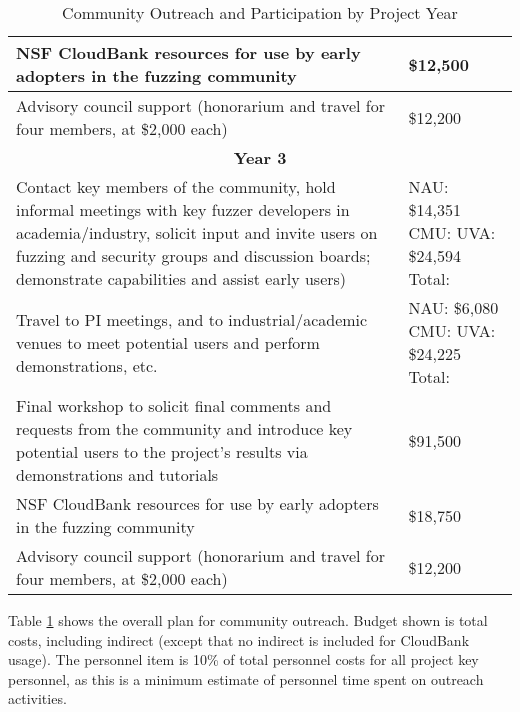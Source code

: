 \documentclass[12pt]{article}
\begin{document}
\begin{table}
\begin{tabular}{|p{12cm}|p{3cm}|}
    \hline
    NSF CloudBank resources for use by early adopters in the fuzzing 
    community & \$12,500 \\
    \hline 
    Advisory council support (honorarium and travel for four members, 
    at \$2,000 each) & \$12,200 \\    
    \hline
    \hline
    \multicolumn{2}{c}{{\bf Year 3}} \\
    \hline
    \hline
   Contact key members of the community, hold informal meetings with
    key fuzzer developers in academia/industry, solicit input and
    invite users
    on fuzzing and security groups and discussion boards; demonstrate
    capabilities and assist early users) &  NAU:  \$14,351 CMU: UVA: \$24,594
                                                      Total:  \\
    \hline
    Travel to PI meetings, and to industrial/academic venues to meet
    potential users and perform demonstrations, etc. & NAU: \$6,080 CMU: UVA:  \$24,225 Total:\\
    \hline    
    Final workshop to solicit final comments and requests from the
    community and introduce key potential users to the project’s
    results via demonstrations and tutorials & \$91,500 \\
    \hline
    NSF CloudBank resources for use by early adopters in the fuzzing 
    community & \$18,750 \\
    \hline 
    Advisory council support (honorarium and travel for four members, 
    at \$2,000 each) & \$12,200 \\    
    \hline    
 
  \end{tabular}
  \caption{Community Outreach and Participation by Project Year}
  \label{tab:outreach}
  
\end{table}


Table \ref{tab:outreach} shows the overall plan for community
outreach.   Budget shown is total costs, including indirect (except
that no indirect is included for CloudBank usage).  The personnel item is 10\%
of total personnel costs for all project key personnel, as this is a
minimum estimate of personnel time spent on outreach activities.
\end{document}
